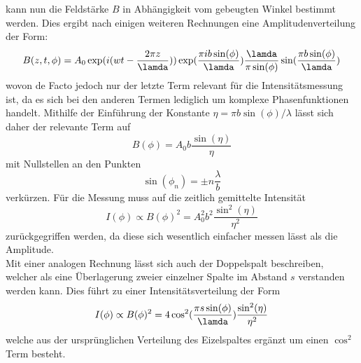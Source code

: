 kann nun die Feldstärke $B$ in Abhängigkeit vom gebeugten Winkel bestimmt werden. Dies ergibt nach einigen weiteren Rechnungen eine 
Amplitudenverteilung der Form:
\begin{equation}
B(z,t,\phi)=A_0\exp(i(wt-\frac{2\pi z}{\lamda}))\exp(\frac{\pi ib\sin(\phi)}{\lamda})\frac{\lamda}{\pi \sin(\phi)}\sin(\frac{\pi b\sin(\phi)}{\lamda})
\end{equation}
wovon de Facto jedoch nur der letzte Term relevant für die Intensitätsmessung ist, da es sich bei den anderen
Termen lediglich um komplexe Phasenfunktionen handelt. Mithilfe der Einführung der Konstante $\eta=\pi b\sin(\phi)/\lambda$
lässt sich daher der relevante Term auf 
\begin{equation}
B(\phi)=A_0b\frac{\sin(\eta)}{\eta}
\end{equation}
mit Nullstellen an den Punkten
\begin{equation}
\sin(\phi_n)=\pm n\frac{\lambda}{b}
\end{equation}
verkürzen. Für die Messung muss auf die zeitlich gemittelte Intensität
\begin{equation}
    \label{eq:einfachspalt}
I(\phi)\propto B(\phi)^2=A_0^2b^2\frac{\sin^2(\eta)}{\eta^2}
\end{equation}
zurückgegriffen werden, da diese sich wesentlich einfacher messen lässt als die Amplitude. \\
Mit einer analogen Rechnung lässt sich auch der Doppelspalt beschreiben, welcher als eine Überlagerung zweier einzelner Spalte im Abstand $s$ verstanden
werden kann. Dies führt zu einer Intensitätsverteilung der Form
\begin{equation}
    \label{eq:doppelspalt}
I(\phi)\propto B(\phi)^2=4\cos^2(\frac{\pi s\sin(\phi)}{\lamda})\frac{\sin^2(\eta)}{\eta^2}
\end{equation}
welche aus der ursprünglichen Verteilung des Eizelspaltes ergänzt um einen $\cos^2$ Term besteht.


